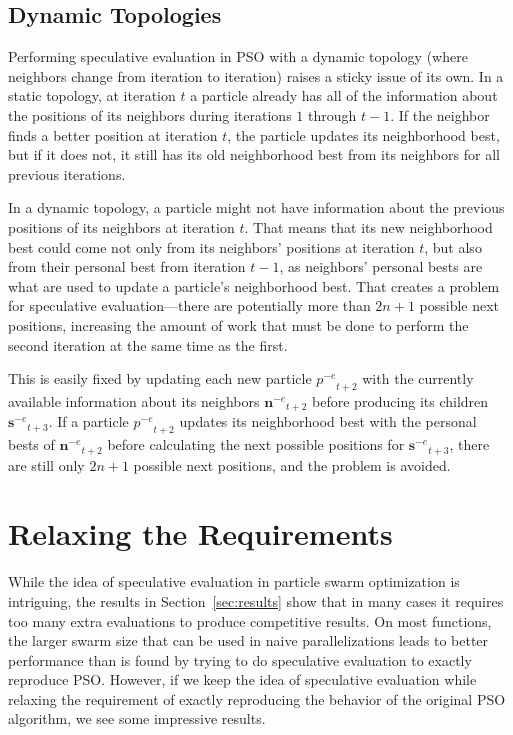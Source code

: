 \documentclass[smallcondensed]{svjour3}
\renewcommand{\sec}[1]{Section~\ref{sec:#1}}
\providecommand{\noeval}[1]{\ensuremath{#1^{-e}}}
\providecommand{\p}{\ensuremath{p}}
\providecommand{\sset}{\ensuremath{\mathbf{s}}}
\providecommand{\nset}{\ensuremath{\mathbf{n}}}
\begin{document}
\subsection{Dynamic Topologies}

Performing speculative evaluation in PSO with a dynamic topology (where
neighbors change from iteration to iteration) raises a sticky issue of its own.
In a static topology, at iteration $t$ a particle already has all of the
information about the positions of its neighbors during iterations $1$ through
$t-1$.  If the neighbor finds a better position at iteration $t$, the particle
updates its neighborhood best, but if it does not, it still has its old
neighborhood best from its neighbors for all previous iterations.

In a dynamic topology, a particle might not have information about the previous
positions of its neighbors at iteration $t$.  That means that its new
neighborhood best could come not only from its neighbors' positions at
iteration $t$, but also from their personal best from iteration $t-1$, as
neighbors' personal bests are what are used to update a particle's neighborhood
best.  That creates a problem for speculative evaluation---there are
potentially more than $2n+1$ possible next positions, increasing the amount of
work that must be done to perform the second iteration at the same time as the
first.

This is easily fixed by updating each new particle $\noeval{\p}_{t+2}$ with the
currently available information about its neighbors $\noeval{\nset}_{t+2}$
before producing its children $\noeval{\sset}_{t+3}$.  If a particle
$\noeval{\p}_{t+2}$ updates its neighborhood best with the personal bests of
$\noeval{\nset}_{t+2}$ before calculating the next possible positions for
$\noeval{\sset}_{t+3}$, there are still only $2n+1$ possible next positions,
and the problem is avoided.

\section{Relaxing the Requirements}
\label{sec:relax}

While the idea of speculative evaluation in particle swarm optimization is
intriguing, the results in \sec{results} show that in many cases it requires
too many extra evaluations to produce competitive results.  On most functions,
the larger swarm size that can be used in naive parallelizations leads to
better performance than is found by trying to do speculative evaluation to
exactly reproduce PSO.  However, if we keep the idea of speculative evaluation
while relaxing the requirement of exactly reproducing the behavior of the
original PSO algorithm, we see some impressive results.
\end{document}
